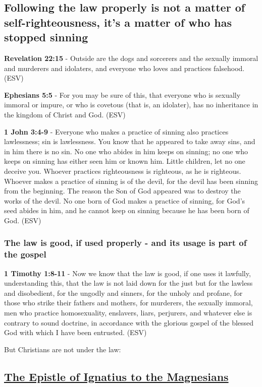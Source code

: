 \documentclass[11pt]{article}
\begin{document}
\subsection{Following the law properly is not a matter of self-righteousness, it's a matter of who has stopped sinning}
\label{sec:org392bf03}
\textbf{Revelation 22:15} -  Outside are the dogs and sorcerers and the sexually immoral and murderers and idolaters, and everyone who loves and practices falsehood.  (ESV)

\textbf{Ephesians 5:5} -  For you may be sure of this, that everyone who is sexually immoral or impure, or who is covetous (that is, an idolater), has no inheritance in the kingdom of Christ and God.  (ESV)

\textbf{1 John 3:4-9} -  Everyone who makes a practice of sinning also practices lawlessness; sin is lawlessness.  You know that he appeared to take away sins, and in him there is no sin.  No one who abides in him keeps on sinning; no one who keeps on sinning has either seen him or known him.  Little children, let no one deceive you.  Whoever practices righteousness is righteous, as he is righteous.  Whoever makes a practice of sinning is of the devil, for the devil has been sinning from the beginning.  The reason the Son of God appeared was to destroy the works of the devil.  No one born of God makes a practice of sinning, for God's seed abides in him, and he cannot keep on sinning because he has been born of God.  (ESV)

\subsubsection{The law is good, if used properly - and its usage is part of the gospel}
\label{sec:org8775857}
\textbf{1 Timothy 1:8-11} - Now we know that the law is good, if one uses it lawfully, understanding this, that the law is not laid down for the just but for the lawless and disobedient, for the ungodly and sinners, for the unholy and profane, for those who strike their fathers and mothers, for murderers, the sexually immoral, men who practice homosexuality, enslavers, liars, perjurers, and whatever else is contrary to sound doctrine, in accordance with the glorious gospel of the blessed God with which I have been entrusted. (ESV)

But Christians are not under the law:
\subsection{\href{http://persweb.wabash.edu/facstaff/royaltyr/AncientCities/web/bradleyj/Project\%201/The\%20Epistle\%20of\%20Ignatius\%20to\%20the\%20Magnesians.htm}{The Epistle of Ignatius to the Magnesians}}
\label{sec:org91a1788}
\end{document}
